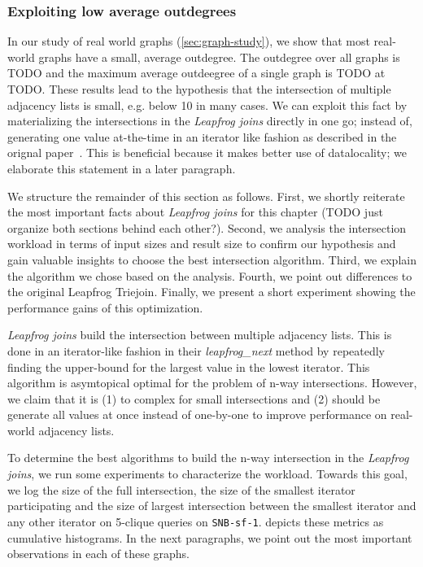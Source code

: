 \subsubsection{Exploiting low average outdegrees}
In our study of real world graphs (\cref{sec:graph-study}), we show that most real-world graphs have a small, average outdegree.
The outdegree over all graphs is TODO and the maximum average outdeegree of a single graph
is TODO at TODO.
These results lead to the hypothesis that the intersection of multiple adjacency lists is small, e.g. below 10 in many cases.
We can exploit this fact by materializing the intersections in the \textit{Leapfrog joins} directly
in one go; instead of, generating one value at-the-time in an iterator like fashion as described in the
orignal paper~\cite{lftj}.
This is beneficial because it makes better use of datalocality; we elaborate this statement in a later
paragraph.

We structure the remainder of this section as follows.
First, we shortly reiterate the most important facts about \textit{Leapfrog joins} for this chapter (TODO just organize both sections
behind each other?).
Second, we analysis the intersection workload in terms of input sizes and result size to confirm our hypothesis
and gain valuable insights to choose the best intersection algorithm.
Third, we explain the algorithm we chose based on the analysis.
Fourth, we point out differences to the original Leapfrog Triejoin.
Finally, we present a short experiment showing the performance gains of this optimization.

\textit{Leapfrog joins} build the intersection between multiple adjacency lists.
This is done in an iterator-like fashion in their \textit{leapfrog\_next} method by repeatedly finding the upper-bound for the largest
value in the lowest iterator.
This algorithm is asymtopical optimal for the problem of n-way intersections.
However, we claim that it is (1) to complex for small intersections and (2) should be generate all values at once instead of one-by-one to
improve performance on real-world adjacency lists.

To determine the best algorithms to build the n-way intersection in the \textit{Leapfrog joins},
we run some experiments to characterize the workload.
Towards this goal, we log the size of the full intersection, the size of the smallest iterator participating
and the size of largest intersection between the smallest iterator and any other iterator on 5-clique queries on \texttt{SNB-sf-1}.
 depicts these metrics as cumulative histograms.
In the next paragraphs, we point out the most important observations in each of these graphs.

